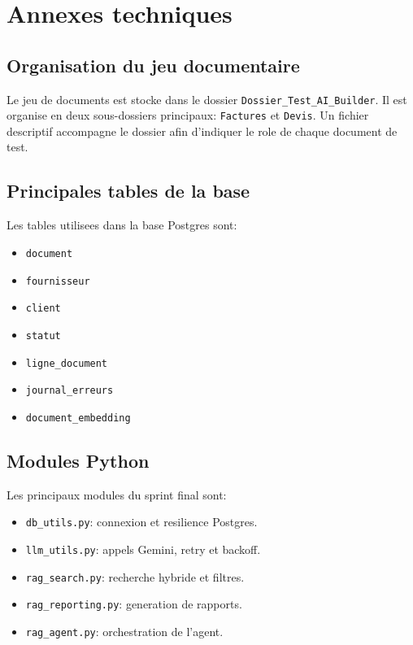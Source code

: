 \appendix
\chapter{Annexes techniques}
\label{chap:appendix}

\section{Organisation du jeu documentaire}

Le jeu de documents est stocke dans le dossier \texttt{Dossier\_Test\_AI\_Builder}. Il est organise en deux sous-dossiers principaux: \texttt{Factures} et \texttt{Devis}. Un fichier descriptif accompagne le dossier afin d'indiquer le role de chaque document de test.

\section{Principales tables de la base}

Les tables utilisees dans la base Postgres sont:

\begin{itemize}
  \item \texttt{document}
  \item \texttt{fournisseur}
  \item \texttt{client}
  \item \texttt{statut}
  \item \texttt{ligne\_document}
  \item \texttt{journal\_erreurs}
  \item \texttt{document\_embedding}
\end{itemize}

\section{Modules Python}

Les principaux modules du sprint final sont:

\begin{itemize}
  \item \texttt{db\_utils.py}: connexion et resilience Postgres.
  \item \texttt{llm\_utils.py}: appels Gemini, retry et backoff.
  \item \texttt{rag\_search.py}: recherche hybride et filtres.
  \item \texttt{rag\_reporting.py}: generation de rapports.
  \item \texttt{rag\_agent.py}: orchestration de l'agent.
\end{itemize}
